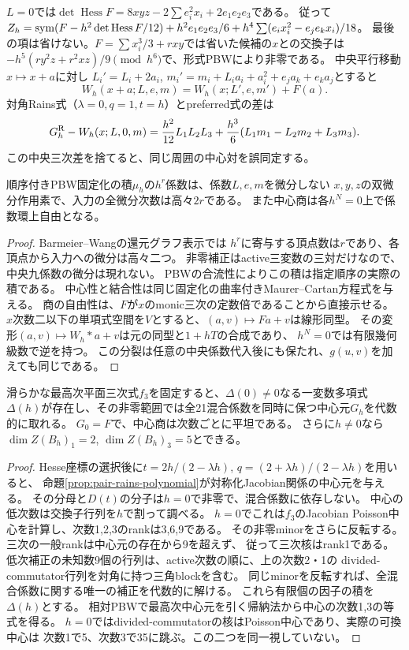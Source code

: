 \begin{remark}[規格化と不可欠な四次項]
$L=0$では$\det\operatorname{Hess}F=8xyz-2\sum e_i^2x_i+2e_1e_2e_3$である。
従って$Z_h=\operatorname{sym}(F-h^2\det\operatorname{Hess}F/12)+h^2e_1e_2e_3/6
+h^4\sum(e_ix_i^2-e_je_kx_i)/18$。
最後の項は省けない。$F=\sum x_i^3/3+rxy$では省いた候補の$x$との交換子は
$-h^5(ry^2z+r^2xz)/9\pmod{h^6}$で、形式PBWにより非零である。
中央平行移動$x\mapsto x+a$に対し
$L_i'=L_i+2a_i$, $m_i'=m_i+L_ia_i+a_i^2+e_ja_k+e_ka_j$とすると
\[
 W_h(x+a;L,e,m)=W_h(x;L',e,m')+F(a).
\]
対角Rains式（$\lambda=0,q=1,t=h$）とpreferred式の差は
\[
 G_h^{\rm R}-W_h(x;L,0,m)
 =\frac{h^2}{12}L_1L_2L_3+
   \frac{h^3}{6}(L_1m_1-L_2m_2+L_3m_3).
\]
この中央三次差を捨てると、同じ周囲の中心対を誤同定する。
\end{remark}
\begin{proposition}[有限微分性と形式正則商]
順序付きPBW固定化の積$\mu_h$の$h^r$係数は、係数$L,e,m$を微分しない
$x,y,z$の双微分作用素で、入力の全微分次数は高々$2r$である。
また中心商は各$h^N=0$上で係数環上自由となる。
\end{proposition}
\begin{proof}
Barmeier--Wang\cite[Theorem 10.3, Lemma 10.9]{PairBW}の還元グラフ表示では
$h^r$に寄与する頂点数は$r$であり、各頂点から入力への微分は高々二つ。
非零補正はactive三変数の三対だけなので、中央九係数の微分は現れない。
PBWの合流性によりこの積は指定順序の実際の積である。
中心性と結合性は同じ固定化の曲率付きMaurer--Cartan方程式を与える。
商の自由性は、$F$が$x$のmonic三次の定数倍であることから直接示せる。
$x$次数二以下の単項式空間を$V$とすると、$(a,v)\mapsto Fa+v$は線形同型。
その変形$(a,v)\mapsto W_h*a+v$は元の同型と$1+hT$の合成であり、
$h^N=0$では有限幾何級数で逆を持つ。
この分裂は任意の中央係数代入後にも保たれ、$g(u,v)$を加えても同じである。
\end{proof}

\begin{corollary}[可換点を含む一様な有限係数量子化]
滑らかな最高次平面三次式$f_3$を固定すると、$\Delta(0)\ne0$なる一変数多項式
$\Delta(h)$が存在し、その非零範囲では全21混合係数を同時に保つ中心元$G_h$を代数的に取れる。
$G_0=F$で、中心商は次数ごとに平坦である。
さらに$h\ne0$なら$\dim Z(B_h)_1=2$, $\dim Z(B_h)_3=5$とできる。
\end{corollary}
\begin{proof}
Hesse座標の選択後に$t=2h/(2-\lambda h)$, $q=(2+\lambda h)/(2-\lambda h)$を用いると、
命題\ref{prop:pair-rains-polynomial}が対称化Jacobian関係の中心元を与える。
その分母と$D(t)$の分子は$h=0$で非零で、混合係数に依存しない。
中心の低次数は交換子行列を$h$で割って調べる。
$h=0$でこれは$f_3$のJacobian Poisson中心を計算し、次数1,2,3のrankは3,6,9である。
その非零minorをさらに反転する。三次の一般rankは中心元の存在から9を超えず、
従って三次核はrank1である。
低次補正の未知数9個の行列は、active次数の順に、上の次数2・1の
divided-commutator行列を対角に持つ三角blockを含む。
同じminorを反転すれば、全混合係数に関する唯一の補正を代数的に解ける。
これら有限個の因子の積を$\Delta(h)$とする。
相対PBWで最高次中心元を引く帰納法から中心の次数1,3の等式を得る。
$h=0$ではdivided-commutatorの核はPoisson中心であり、実際の可換中心は
次数1で5、次数3で35に跳ぶ。この二つを同一視していない。
\end{proof}
